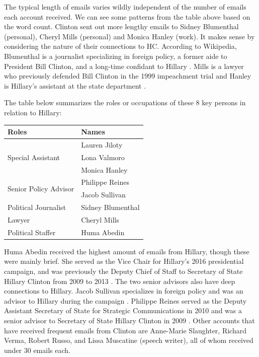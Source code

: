 The typical length of emails varies wildly independent of the number of emails each account received. We can see some patterns from the table above based on the word count. Clinton sent out more lengthy emails to Sidney Blumenthal (personal), Cheryl Mills (personal) and Monica Hanley (work). It makes sense by considering the nature of their connections to HC. 
According to Wikipedia, Blumenthal is a journalist specializing in foreign policy, a former aide to President Bill Clinton, and a long-time confidant to Hillary \cite{sidney2016}. Mills is a lawyer who previously defended Bill Clinton in the 1999 impeachment trial \cite{sidney2016} and Hanley is Hillary's assistant at the state department \cite{zimmermankey2016}.

The table below summarizes the roles or occupations of these 8 key persons in relation to Hillary:

\begin{center}
  \begin{tabular}[h]{|l|l|} 
    \hline
    Roles & Names  \\
    \hline
    \multirow{3}{*}{Special Assistant} 
          & Lauren Jiloty \\ 
          & Lona Valmoro \\ 
          & Monica Hanley  \\ 
    \hline
    \multirow{2}{*}{Senior Policy Advisor} 
          & Philippe Reines \\
          & Jacob Sullivan \\ 
    \hline
    \multirow{1}{*}{Political Journalist} 
          & Sidney Blumenthal \\ 
    \hline
    \multirow{1}{*}{Lawyer} 
          & Cheryl Mills \\
    \hline
    \multirow{1}{*}{Political Staffer} 
          & Huma Abedin \\ 
    \hline
  \end{tabular}
\end{center}

Huma Abedin received the highest amount of emails from Hillary, though these were mainly brief. She served as the Vice Chair for Hillary's 2016 presidential campaign, and was previously the Deputy Chief of Staff to Secretary of State Hillary Clinton from 2009 to 2013 \cite{huma2016}. The two senior advisors also have deep connections to Hillary. Jacob Sullivan specializes in foreign policy and was an advisor to Hillary during the campaign \cite{jake2016}. Philippe Reines served as the Deputy Assistant Secretary of State for Strategic Communications in 2010 and was a senior advisor to Secretary of State Hillary Clinton in 2009 \cite{philippe2016}. Other accounts that have received frequent emails from Clinton are Anne-Marie Slaughter, Richard Verma, Robert Russo, and Lissa Muscatine (speech writer), all of whom received under 30 emails each. 

